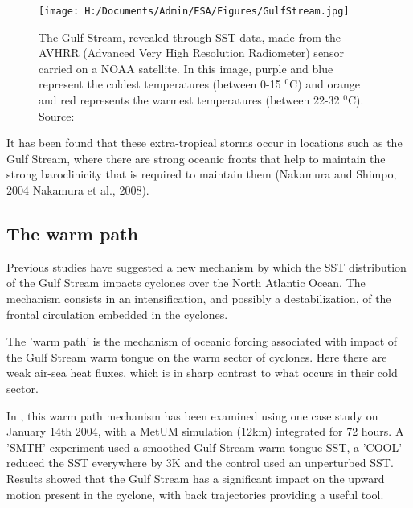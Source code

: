 \begin{figure}[h]
	\centering
	\noindent\texttt{[image: H:/Documents/Admin/ESA/Figures/GulfStream.jpg]}\\
	\caption{The Gulf Stream, revealed through SST data, made from the AVHRR (Advanced Very High Resolution Radiometer) sensor carried on a NOAA satellite. In this image, purple and blue represent the coldest temperatures (between 0-15 $^0$C) and orange and red represents the warmest temperatures (between 22-32 $^0$C). Source: \cite{gsnasa}}\label{fig:GS_map}
\end{figure}



It has been found that these extra-tropical storms occur in locations such as the Gulf Stream, where there are strong oceanic fronts that help to maintain the strong baroclinicity that is required to maintain them (Nakamura and Shimpo, 2004 Nakamura et al., 2008).



\subsection{The warm path}

Previous studies \cite{vanniere2017cold} \cite{sheldon2017warm} have suggested a new mechanism by which the SST distribution of the Gulf Stream impacts cyclones over the North Atlantic Ocean. The mechanism consists in an intensification, and possibly a destabilization, of the frontal circulation embedded in the cyclones. 

The 'warm path' is the mechanism of oceanic forcing  associated with impact of the Gulf Stream warm tongue on the warm sector of cyclones. Here there are weak air-sea heat fluxes, which is in sharp contrast to what occurs in their cold sector.

In \cite{sheldon2017warm} , this warm path mechanism has been examined using one case study on January 14th 2004, with a MetUM simulation (12km) integrated for 72 hours. A 'SMTH' experiment used a smoothed Gulf Stream warm tongue SST, a 'COOL' reduced the SST everywhere by 3K and the control used an unperturbed SST. Results showed that the Gulf Stream has a significant impact on the upward motion present in the cyclone, with back trajectories providing a useful tool. 

